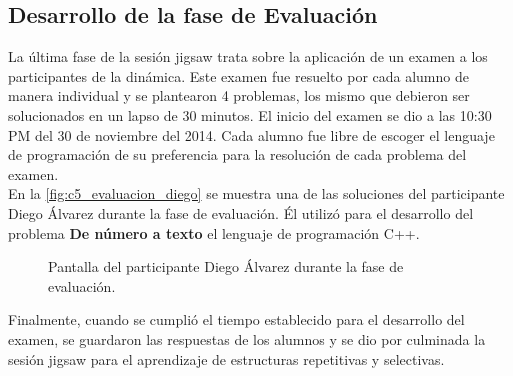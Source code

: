 \subsection{Desarrollo de la fase de Evaluación}
La última fase de la sesión jigsaw trata sobre la aplicación de un examen a los participantes de la dinámica. Este examen fue resuelto por cada alumno de manera individual y se plantearon 4 problemas, los mismo que debieron ser solucionados en un lapso de 30 minutos. El inicio del examen se dio a las 10:30 PM del 30 de noviembre del 2014. Cada alumno fue libre de escoger el lenguaje de programación de su preferencia para la resolución de cada problema del examen.\\

En la \autoref{fig:c5_evaluacion_diego} se muestra una de las soluciones del participante Diego Álvarez durante la fase de evaluación. Él utilizó para el desarrollo del problema \textbf{De número a texto} el lenguaje de programación C++.\\

\begin{figure}
	\centering
	\caption[Evaluación - Diego Álvarez]{Pantalla del participante Diego Álvarez durante la fase de evaluación.}
	\label{fig:c5_evaluacion_diego}
\end{figure}

Finalmente, cuando se cumplió el tiempo establecido para el desarrollo del examen, se guardaron las respuestas de los alumnos y se dio por culminada la sesión jigsaw para el aprendizaje de estructuras repetitivas y selectivas.